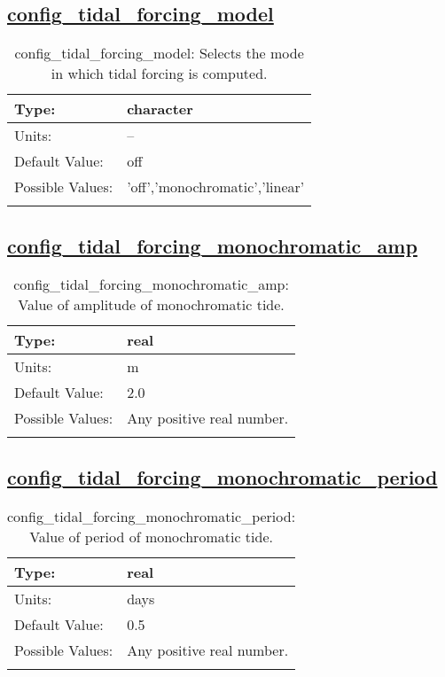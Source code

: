 \subsection[config\_tidal\_forcing\_model]{\hyperref[sec:nm_tab_tidal_forcing]{config\_tidal\_forcing\_model}}
\label{subsec:nm_sec_config_tidal_forcing_model}
\begin{center}
\begin{longtable}{| p{2.0in} || p{4.0in} |}
    \hline
    Type: & character \\
    \hline
    Units: & -- \\
    \hline
    Default Value: & off \\
    \hline
    Possible Values: & 'off','monochromatic','linear' \\
    \hline
    \caption{config\_tidal\_forcing\_model: Selects the mode in which tidal forcing is computed.}
\end{longtable}
\end{center}
\subsection[config\_tidal\_forcing\_monochromatic\_amp]{\hyperref[sec:nm_tab_tidal_forcing]{config\_tidal\_forcing\_monochromatic\_amp}}
\label{subsec:nm_sec_config_tidal_forcing_monochromatic_amp}
\begin{center}
\begin{longtable}{| p{2.0in} || p{4.0in} |}
    \hline
    Type: & real \\
    \hline
    Units: & \si{m} \\
    \hline
    Default Value: & 2.0 \\
    \hline
    Possible Values: & Any positive real number. \\
    \hline
    \caption{config\_tidal\_forcing\_monochromatic\_amp: Value of amplitude of monochromatic tide.}
\end{longtable}
\end{center}
\subsection[config\_tidal\_forcing\_monochromatic\_period]{\hyperref[sec:nm_tab_tidal_forcing]{config\_tidal\_forcing\_monochromatic\_period}}
\label{subsec:nm_sec_config_tidal_forcing_monochromatic_period}
\begin{center}
\begin{longtable}{| p{2.0in} || p{4.0in} |}
    \hline
    Type: & real \\
    \hline
    Units: & \si{days} \\
    \hline
    Default Value: & 0.5 \\
    \hline
    Possible Values: & Any positive real number. \\
    \hline
    \caption{config\_tidal\_forcing\_monochromatic\_period: Value of period of monochromatic tide.}
\end{longtable}
\end{center}
